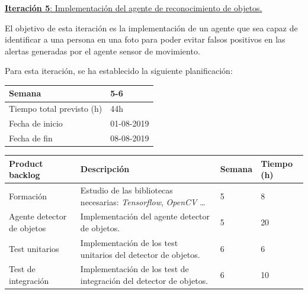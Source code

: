 \newpage


\large{\underline{\textbf{Iteración 5}: Implementación del agente de reconocimiento de objetos.}}
\vspace{0.3cm}

\normalsize

El objetivo de esta iteración es la implementación de un agente que sea capaz de identificar a una persona en una foto para poder evitar falsos positivos en las alertas generadas por el agente sensor de movimiento.

Para esta iteración, se ha establecido la siguiente planificación:

\begin{table}[h!]
\centering
\begin{tabular}{|p{5cm}|p{4cm}|}
 \hline
	\cellcolor[gray]{0.9} Semana  & 5-6 \\ \hline
	\cellcolor[gray]{0.9} Tiempo total previsto (h)  & 44h \\ \hline
	\cellcolor[gray]{0.9} Fecha de inicio  & 01-08-2019 \\ \hline
	\cellcolor[gray]{0.9} Fecha de fin  & 08-08-2019 \\ \hline
		
\end{tabular}
\end{table}

\begin{table}[h!]
\begin{tabular}{|p{4cm}|p{7.2cm}|p{1.3cm}|p{2.1cm}|}
\hline
\rowcolor[HTML]{9B9B9B} 
{\color[HTML]{FFFFFF} Product backlog} & {\color[HTML]{FFFFFF} Descripción}                                  & {\color[HTML]{FFFFFF} Semana} & {\color[HTML]{FFFFFF}Tiempo (h)} \\ \hline
Formación                          & Estudio de las bibliotecas necesarias: \textit{Tensorflow}, \textit{OpenCV} \ldots
                                        & 5                            & 8                                   \\ \hline
Agente detector de objetos & Implementación del agente detector de objetos.

          & 5                             & 20                                   \\ \hline
          
Test unitarios                         &  Implementación de los test unitarios del detector de objetos.
          & 6                             & 6                                   \\ \hline

Test de integración                        & Implementación de los test de integración del detector de objetos.
          & 6                             & 10                                   \\ \hline

\end{tabular}
\end{table}

